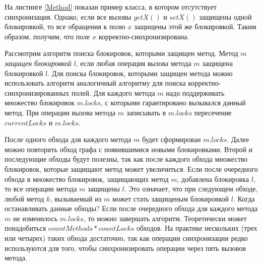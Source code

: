 На листинге \ref{Method} показан пример класса, в котором отсутствует синхронизация. Однако, если все вызовы $getX()$ и $setX()$ защищены одной блокировкой, то все обращения к полю $x$ защищены этой же блокировкой. Таким образом, получим, что поле $x$ корректно-синхронизирована.

Рассмотрим алгоритм поиска блокировок, которыми защищен метод. Метод $m$ \emph{защищен блокировкой} $l$, если любая операция вызова метода $m$ защищена блокировкой $l$. Для поиска блокировок, которыми защищен метода можно использовать алгоритм аналогичный алгоритму для поиска корректно-синхронизированных полей. Для каждого метода $m$ надо поддерживать множество блокировок $m.locks$, с которыми гарантировано вызывался данный метод. При операции вызова метода $m$ записывать в $m.locks$ пересечение $currentLocks$ и $m.locks$.

После одного обхода для каждого метода $m$ будет сформирован $m.locks$. Далее можно повторить обход графа с появившимися новыми блокировками. Второй и последующие обходы будут полезны, так как после каждого обхода множество блокировок, которые защищают метод может увеличиться. Если после очередного обхода в множество блокировок, защищающих метод $m$, добавлена блокировка $l$, то все операции метода $m$ защищены $l$. Это означает, что при следующем обходе, любой метод $k$, вызываемый из $m$ может стать защищеным блокировкой $l$. Когда останавливать данные обходы? Если после очередного обхода для каждого метода $m$ не изменилось  $m.locks$, то можно завершать алгоритм. Теоретически может понадобиться $countMethods * countLocks$ обходов. На практике нескольких (трех или четырех) таких обхода достаточно, так как операции синхронизации редко используются для того, чтобы синхронизировать операции через пять вызовов метода.
\FloatBarrier
